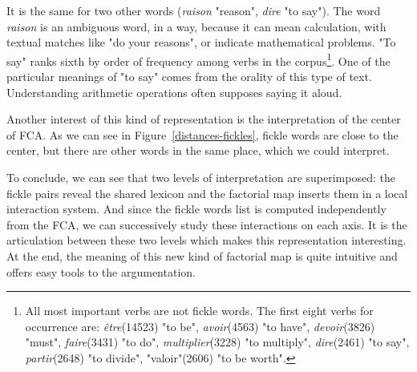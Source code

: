 \documentclass[preprint]{elsarticle}
\begin{document}
It is the same for two other words (\textit{raison} "reason", \textit{dire} "to say"). The word \textit{raison} is an ambiguous word, in a way, because it can mean calculation, with textual matches like "do your reasons", or indicate mathematical problems. "To say" ranks sixth by order of frequency among verbs in the corpus\footnote{All most important verbs are not fickle words. The first eight verbs for occurrence are: \textit{être}(14523) "to be", \textit{avoir}(4563) "to have", \textit{devoir}(3826) "must", \textit{faire}(3431) "to do", \textit{multiplier}(3228) "to multiply", \textit{dire}(2461) "to say", \textit{partir}(2648) "to divide", "valoir"(2606) "to be worth".}. One of the particular meanings of "to say" comes from the orality of this type of text. Understanding arithmetic operations often supposes saying it aloud. 


Another interest of this kind of representation is the interpretation of the center of FCA. As we can see in Figure~\ref{distances-fickles}, fickle words are close to the center, but there are other words in the same place, which we could interpret. 

To conclude, we can see that two levels of interpretation are superimposed: the fickle pairs reveal the shared lexicon and the factorial map inserts them in a local interaction system. And since the fickle words list is computed independently from the FCA, we can successively study these interactions on each axis. It is the articulation between these two levels which makes this representation interesting. At the end, the meaning of this new kind of factorial map is quite intuitive and offers easy tools to the argumentation.
\end{document}
